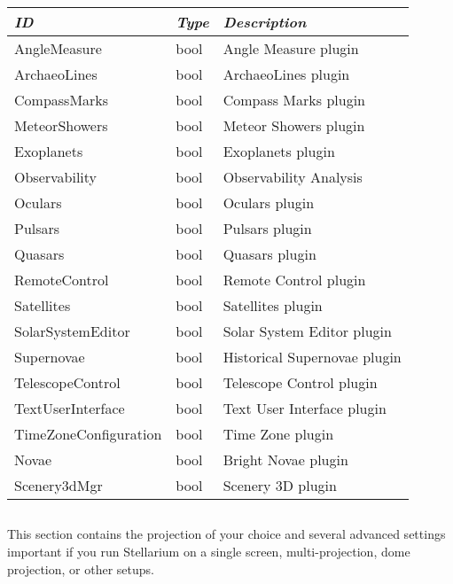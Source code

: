 \begin{longtabu} to \textwidth {l|l|X}
\toprule
\emph{ID} & \emph{Type} & \emph{Description}\\\midrule
AngleMeasure          & bool & Angle Measure plugin\\\midrule
ArchaeoLines          & bool & ArchaeoLines plugin\\\midrule
CompassMarks          & bool & Compass Marks plugin\\\midrule
MeteorShowers         & bool & Meteor Showers plugin \\\midrule
Exoplanets            & bool & Exoplanets plugin \\\midrule
Observability         & bool & Observability Analysis\\\midrule
Oculars               & bool & Oculars plugin \\\midrule
Pulsars               & bool & Pulsars plugin \\\midrule
Quasars               & bool & Quasars plugin \\\midrule
RemoteControl         & bool & Remote Control plugin \\\midrule
Satellites            & bool & Satellites plugin \\\midrule
SolarSystemEditor     & bool & Solar System Editor plugin\\\midrule
Supernovae            & bool & Historical Supernovae plugin \\\midrule
TelescopeControl      & bool & Telescope Control plugin \\\midrule
TextUserInterface     & bool & Text User Interface plugin \\\midrule
TimeZoneConfiguration & bool & Time Zone plugin \\\midrule
Novae                 & bool & Bright Novae plugin \\\midrule
Scenery3dMgr          & bool & Scenery 3D plugin \\\bottomrule
\end{longtabu}

\subsection{}\label{sec:config.ini:projection}

This section contains the projection of your choice and several
advanced settings important if you run Stellarium on a single screen,
multi-projection, dome projection, or other setups.

